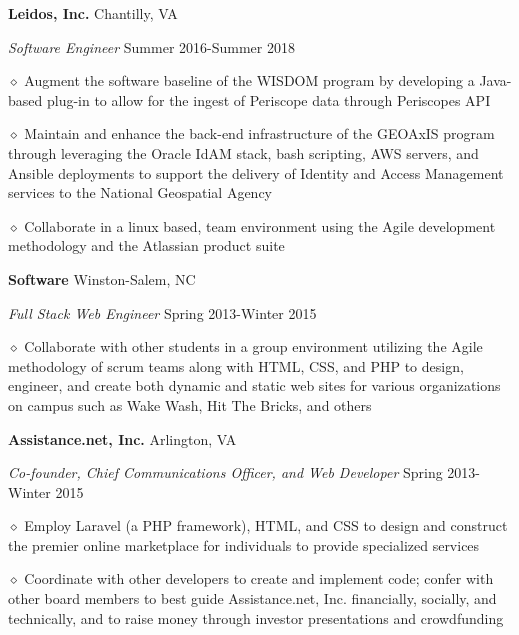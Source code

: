 \documentclass[executivepaper]{extarticle}
\begin{document}
\begin{center}
{\begin{minipage}{7.0in}
\vspace{-1mm}

{\noindent \textbf{\fontsize{9}{8}\selectfont Leidos, Inc.}} {\hfill \fontsize{9}{8}\selectfont Chantilly, VA}

{\noindent \textit{\fontsize{9}{8}\selectfont Software Engineer}} {\hfill \fontsize{9}{8}\selectfont Summer 2016-Summer 2018}

{\noindent $\diamond$ {\fontsize{9}{8}\selectfont Augment the software baseline of the WISDOM program by developing a Java-based plug-in to allow for the ingest of Periscope data through Periscope\textsc{}s API}}

{\noindent $\diamond$ {\fontsize{9}{8}\selectfont Maintain and enhance the back-end infrastructure of the GEOAxIS program through leveraging the Oracle IdAM stack, bash scripting, AWS servers, and Ansible deployments to support the delivery of Identity and Access Management services to the National Geospatial Agency}}

{\noindent $\diamond$ {\fontsize{9}{8}\selectfont Collaborate in a linux based, team environment using the Agile development methodology and the Atlassian product suite}}

{\noindent \textbf{\fontsize{9}{8} Software}} {\hfill \fontsize{9}{8}\selectfont Winston-Salem, NC}

{\noindent \textit{\fontsize{9}{8}\selectfont Full Stack Web Engineer}} {\hfill \fontsize{9}{8}\selectfont Spring 2013-Winter 2015}

{\noindent $\diamond$ {\fontsize{9}{8}\selectfont Collaborate with other students in a group environment utilizing the Agile methodology of scrum teams along with
HTML, CSS, and PHP to design, engineer, and create both dynamic and static web sites for various organizations on campus such as Wake Wash, Hit The Bricks, and others}}

{\noindent \textbf{\fontsize{9}{8}\selectfont Assistance.net, Inc.}} {\hfill \fontsize{9}{8}\selectfont Arlington, VA}

{\noindent \textit{\fontsize{9}{8}\selectfont Co-founder, Chief Communications Officer, and Web Developer}} {\hfill \fontsize{9}{8}\selectfont Spring 2013-Winter 2015}

{\noindent $\diamond$ {\fontsize{9}{8}\selectfont Employ Laravel (a PHP framework), HTML, and CSS to design and construct the premier online marketplace for individuals to provide specialized services}}

{\noindent $\diamond$ {\fontsize{9}{8}\selectfont Coordinate with other developers to create and implement code; confer with other board members to best guide Assistance.net, Inc. financially, socially, and technically,
and to raise money through investor presentations and crowdfunding}}


\end{minipage}}
\end{center}
\end{document}

